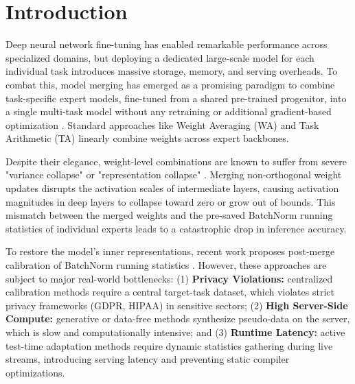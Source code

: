 \documentclass{article}
\theoremstyle{plain}
\theoremstyle{definition}
\theoremstyle{remark}
\begin{document}
\section{Introduction}
\label{sec:intro}

Deep neural network fine-tuning has enabled remarkable performance across specialized domains, but deploying a dedicated large-scale model for each individual task introduces massive storage, memory, and serving overheads. To combat this, model merging has emerged as a promising paradigm to combine task-specific expert models, fine-tuned from a shared pre-trained progenitor, into a single multi-task model without any retraining or additional gradient-based optimization \cite{wortsman2022model, ilharco2023editing}. Standard approaches like Weight Averaging (WA) and Task Arithmetic (TA) linearly combine weights across expert backbones.

Despite their elegance, weight-level combinations are known to suffer from severe "variance collapse" or "representation collapse" \cite{jordan2023repair, tang2024post}. Merging non-orthogonal weight updates disrupts the activation scales of intermediate layers, causing activation magnitudes in deep layers to collapse toward zero or grow out of bounds. This mismatch between the merged weights and the pre-saved BatchNorm running statistics of individual experts leads to a catastrophic drop in inference accuracy.

To restore the model's inner representations, recent work proposes post-merge calibration of BatchNorm running statistics \cite{tang2024post}. However, these approaches are subject to major real-world bottlenecks: (1) \textbf{Privacy Violations:} centralized calibration methods \cite{jordan2023repair} require a central target-task dataset, which violates strict privacy frameworks (GDPR, HIPAA) in sensitive sectors; (2) \textbf{High Server-Side Compute:} generative or data-free methods \cite{submission10} synthesize pseudo-data on the server, which is slow and computationally intensive; and (3) \textbf{Runtime Latency:} active test-time adaptation methods \cite{submission5} require dynamic statistics gathering during live streams, introducing serving latency and preventing static compiler optimizations.
\end{document}

